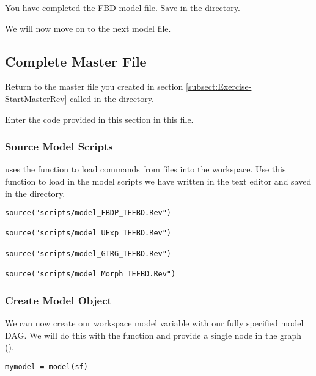 {\begin{framed}
You have completed the FBD model file. Save  in the  directory.

We will now move on to the next model file.
\end{framed}}

\bigskip

\subsection{Complete Master \Rev File}\label{subsect:Exercise-CompleteMCMC}

{\begin{framed}
Return to the master \Rev file you created in section \ref{subsect:Exercise-StartMasterRev} called {\textcolor{red}{}} in the  directory.

Enter the \Rev code provided in this section in this file.
\end{framed}}

\medskip
\subsubsection{Source Model Scripts}\label{subsub:Exercise-SourceMods}

\RevBayes uses the  function to load commands from \Rev files into the workspace.
Use this function to load in the model scripts we have written in the text editor and saved in the  directory.
{\tt \begin{snugshade*}
\begin{lstlisting}
source("scripts/model_FBDP_TEFBD.Rev")

source("scripts/model_UExp_TEFBD.Rev")

source("scripts/model_GTRG_TEFBD.Rev")

source("scripts/model_Morph_TEFBD.Rev")
\end{lstlisting}
\end{snugshade*}}


\medskip
\subsubsection{Create Model Object}\label{subsub:Exercise-ModObj}

We can now create our workspace model variable with our fully specified model DAG. 
We will do this with the  function and provide a single node in the graph ().
{\tt \begin{snugshade*}
\begin{lstlisting}
mymodel = model(sf)
\end{lstlisting}
\end{snugshade*}}

